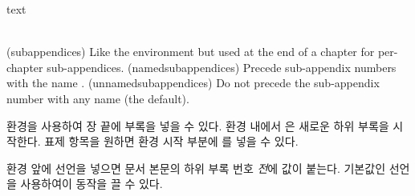 \begin{syntax}
 text  \\
\cmd{\namedsubappendices} \cmd{\unnamedsubappendices} \\
\end{syntax}
\glossary(subappendices)%
  {}%
  {Like the  environment but used at the end of a chapter
   for per-chapter sub-appendices.}
\glossary(namedsubappendices)%
  {}%
  {Precede sub-appendix numbers with the name .}
\glossary(unnamedsubappendices)%
  {}%
  {Do not precede the sub-appendix number with any name (the default).}

 환경을 사용하여 장 끝에 부록을 넣을 수 있다. 환경 내에서 \cmd{\section} 은 새로운 하위 부록을 시작한다.  표제 항목을 원하면 환경 시작 부분에 \cmd{\addappheadtotoc} 를 넣을 수 있다.

 환경 앞에 \cmd{\namedsubappendices} 선언을 넣으면 문서 본문의 하위 부록 번호 \emph{전}에 \cmd{\appendixname} 값이 붙는다. 기본값인 \cmd{\unnamedsubappendices} 선언을 사용하여이 동작을 끌 수 있다.

